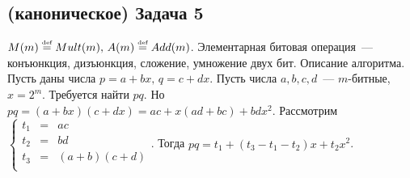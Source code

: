 \documentclass[a4paper]{article}
\def\eqdef{\overset{\mbox{\tiny def}}{=}}
\begin{document}
\subsection*{(каноническое) Задача 5}
$M(m)\eqdef Mult(m),\,A(m)\eqdef Add(m)$.\newline
Элементарная битовая операция~--- конъюнкция, дизъюнкция, сложение, умножение двух бит.\newline
Описание алгоритма. Пусть даны числа $p=a+bx,\,q=c+dx$. Пусть числа $a,b,c,d$~--- $m$-битные, $x=2^m$. Требуется найти $pq$. Но $pq=(a+bx)(c+dx)=ac+x(ad+bc)+bdx^2$. Рассмотрим $\left\{\begin{array}{lll}
t_1 & = & ac\\
t_2 & = & bd\\
t_3 & = & (a+b)(c+d)\\
\end{array}\right.$. Тогда $pq=t_1+(t_3-t_1-t_2)x+t_2x^2$.
\end{document}

